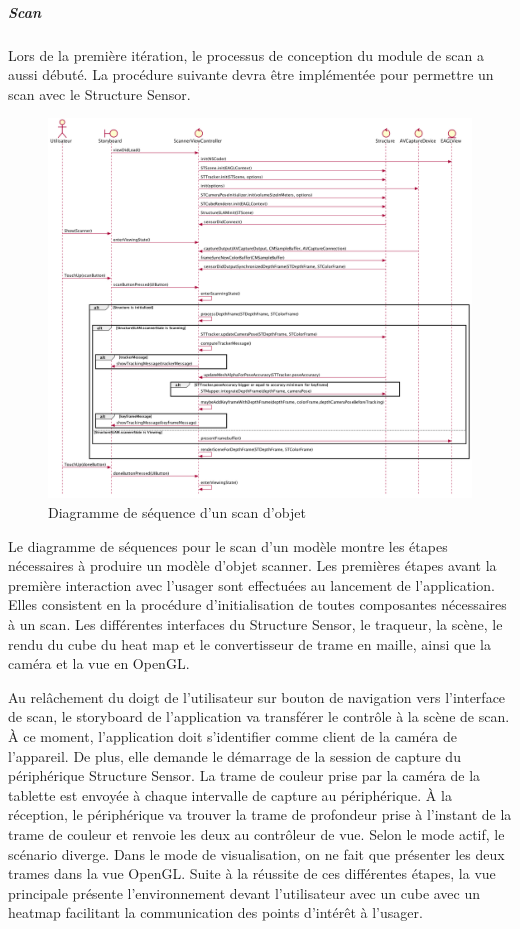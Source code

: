 \documentclass[rapport.tex]{subfiles}
\begin{document}
\newpage
\subparagraph*{Scan}
Lors de la première itération, le processus de conception du module de scan a aussi débuté. La procédure suivante devra être implémentée pour permettre un scan avec le Structure Sensor.
\begin{figure}[H]
    \includegraphics[width=\textwidth]{diagrams/dss-scanner.png}
\centering
    \caption{Diagramme de séquence d'un scan d'objet}
\end{figure}
Le diagramme de séquences pour le scan d’un modèle montre les étapes nécessaires à produire un modèle d’objet scanner. Les premières étapes avant la première interaction avec l’usager sont effectuées au lancement de l’application. Elles consistent en la procédure d’initialisation de toutes composantes nécessaires à un scan. Les différentes interfaces du Structure Sensor, le traqueur, la scène, le rendu du cube du heat map et le convertisseur de trame en maille, ainsi que la caméra et la vue en OpenGL.
\par
Au relâchement du doigt de l’utilisateur sur bouton de navigation vers l’interface de scan, le storyboard de l’application va transférer le contrôle à la scène de scan. À ce moment, l’application doit s'identifier comme client de la caméra de l’appareil. De plus, elle demande le démarrage de la session de capture du périphérique Structure Sensor. La trame de couleur prise par la caméra de la tablette est envoyée à chaque intervalle de capture au périphérique. À la réception, le périphérique va trouver la trame de profondeur prise à l’instant de la trame de couleur et renvoie les deux au contrôleur de vue. Selon le mode actif, le scénario diverge. Dans le mode de visualisation, on ne fait que présenter les deux trames dans la vue OpenGL. Suite à la réussite de ces différentes étapes, la vue principale présente l’environnement devant l’utilisateur avec un cube avec un heatmap facilitant la communication des points d’intérêt à l’usager.
\end{document}

